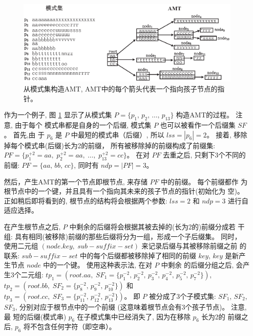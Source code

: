 \begin{figure}[H]
  \centering
  \includegraphics[width=\textwidth]{figures/2_MPM/AMT}
  \caption{从模式集构造AMT, AMT中的每个箭头代表一个指向孩子节点的指针。}
  \label{fig:AMT}
\end{figure}

作为一个例子, 图 \ref{fig:AMT} 显示了从模式集
$P = \{p_1,\, p_2,\, \dots,\, p_{13}\}$ 构造AMT的过程。 注意, 由于每个
模式串都是自身的一个后缀, 模式集 $P$ 也可以被看作一个后缀集 $SF$。 首先,由
于 $p_6$ 是 $P$ 中最短的模式串（后缀）, 所以 $lss = |p_6| = 2$。 接着,
移除掉每个模式串(后缀)长为2的前缀， 所有被移除掉的前缀构成了前缀集:
$PF = \{p_1^{+2} = aa,\; p_2^{+2} = aa,\; \dots,\; p_{13}^{+2} =
cc\}$。  在对 $PF$ 去重之后, 只剩下3个不同的前缀: $PF = \{aa,\, bb,\,
cc\}$, 同时有 $ndp = |PF| = 3$。

然后，产生AMT的第一个节点即根节点, 来存储 $PF$ 中的前缀。 每个前缀都作
为根节点中的一个键，并且具有一个指向其未来的孩子节点的指针(初始化为
空)。 正如稍后即将看到的, 根节点的结构将会根据两个参数:
$lss=2$ 和 $ndp=3$ 进行自适应选择。

在产生根节点之后, $P$ 中剩余的后缀将会根据其被去掉的(长为2的)前缀分成若
干组: 具有相同(被移除)前缀的那些后缀将分为一组，形成一个子后缀集。 同时，
使用二元组 $(node.key,\; sub-suffix-set)$ 来记录后缀与其被移除前缀之前
的联系: $sub-suffix-set$ 中的每个后缀都被移除掉了相同的前缀 $key$,
$key$ 是新产生节点 $node$ 中的一个键。 使用这种表示法, 在对 $P$ 中剩余
的后缀分组之后, 会产生3个二元组:
$tp_1 = (root.aa,\; SF_1=\{p_1^{-2},\, p_2^{-2},\, p_3^{-2},\,
p_4^{-2},\, p_5^{-2},\, p_7^{-2}\})$,\,
$tp_2 = (root.bb,\; SF_2=\{p_8^{-2},\, p_9^{-2},\,
p_{10}^{-2}\})$
和$tp_3 = (root.cc,\; SF_3=\{p_{11}^{-2},\, p_{12}^{-2},\,
p_{13}^{-2}\})$。 即 $P$ 被分成了3个子模式集: $SF_1$, $SF_2$, $SF_3$,
分别对应于根节点中的一个前缀 (这意味着根节点会有3个孩子节点)。 注意, 最
短的后缀(模式串) $p_6$ 在子模式集中已经消失了, 因为在移除 $p_6$ 长为2的
前缀之后, $p_6$ 将不包含任何字符（即空串）。

